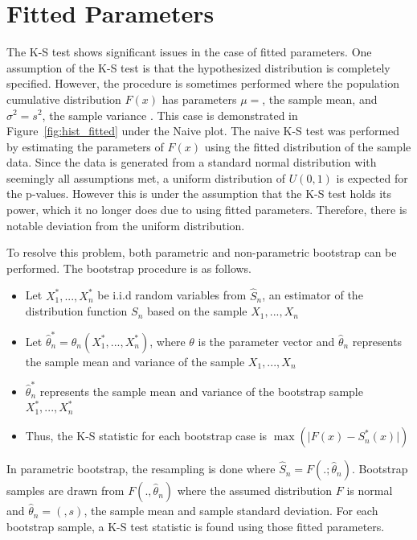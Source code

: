 \documentclass[12pt, letterpaper, titlepage]{article}
\makeatletter
\newcommand*{\Xbar}{}%
\DeclareRobustCommand*{\Xbar}{%
  \mathpalette\@Xbar{}%
}
\newcommand*{\@Xbar}[2]{%
  \sbox0{$#1\mathrm{X}\m@th$}%
  \sbox2{$#1X\m@th$}%
  \rlap{%
    \hbox to\wd2{%
      \hfill
      $\overline{%
        \vrule width 0pt height\ht0 %
        \kern\wd0 %
      }$%
    }%
  }%
  \copy2 %
}
\makeatother
\begin{document}
\hypertarget{sec:fitted}{%
\section{Fitted Parameters}\label{sec:fitted}}

The K-S test shows significant issues in the case of fitted parameters. One assumption 
of the K-S test is that the hypothesized distribution is completely specified. 
However, the procedure is sometimes performed where the population cumulative 
distribution $F(x)$ has parameters $\mu=\Xbar$, the sample mean, and $\sigma^2=s^2$, 
the sample variance \citep{Lilliefors}. This case is demonstrated in Figure~\ref{fig:hist_fitted} 
under the Naive plot. The naive K-S test was performed by estimating the parameters 
of $F(x)$ using the fitted distribution of the sample data. Since the data is generated 
from a standard normal distribution with seemingly all assumptions met, a uniform 
distribution of $U(0,1)$ is expected for the p-values. However this is under the 
assumption that the K-S test holds its power, which it no longer does due to using 
fitted parameters. Therefore, there is notable deviation from the uniform distribution. 

To resolve this problem, both parametric and non-parametric bootstrap can be performed. 
The bootstrap procedure is as follows. 

\begin{itemize}
  \item 
    Let $X_1^*,...,X_n^*$ be i.i.d random variables from $\hat{S}_n$, an estimator 
    of the distribution function $S_n$ based on the sample $X_1,...,X_n$
  \item 
    Let $\hat{\theta}_n^* = \theta_n(X_1^*,...,X_n^*)$, where $\theta$ is the 
    parameter vector and $\hat{\theta}_n$ represents the sample mean and variance 
    of the sample $X_1,...,X_n$
  \item 
    $\hat{\theta}_n^*$ represents the sample mean and variance of the bootstrap 
    sample $X_1^*,...,X_n^*$
  \item Thus, the K-S statistic for each bootstrap case is $\max(\lvert F(x)-S^*_n(x) \rvert)$
\end{itemize}

In parametric bootstrap, the resampling is done where $\hat{S}_n = F(.;\hat{\theta}_n)$. 
Bootstrap samples are drawn from ${F}(.,\hat{\theta}_n)$ where the assumed distribution 
$F$ is normal and $\hat{\theta}_n = (\Xbar, s)$, the sample mean and sample standard 
deviation. For each bootstrap sample, a K-S test statistic is found using those 
fitted parameters.
\end{document}
